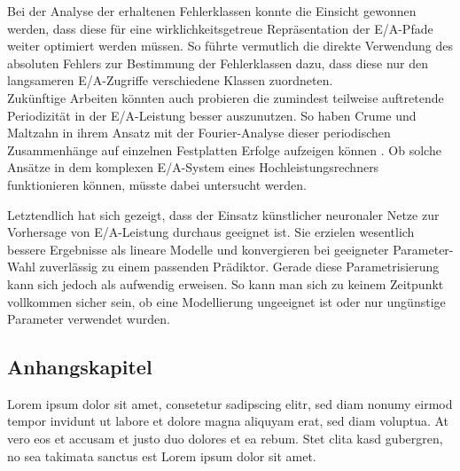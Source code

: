 \documentclass[
	12pt,
	a4paper,
	BCOR10mm,
	DIV14,
	listof=totoc,
	bibliography=totoc,
	headsepline
]{scrreprt}
\begin{document}
Bei der Analyse der erhaltenen Fehlerklassen konnte die Einsicht gewonnen werden, dass diese für eine wirklichkeitsgetreue Repräsentation der E/A-Pfade weiter optimiert werden müssen. 
So führte vermutlich die direkte Verwendung des absoluten Fehlers zur Bestimmung der Fehlerklassen dazu, dass diese nur den langsameren E/A-Zugriffe verschiedene Klassen zuordneten.\\
Zukünftige Arbeiten könnten auch probieren die zumindest teilweise auftretende Periodizität in der E/A-Leistung besser auszunutzen. 
So haben Crume und Maltzahn in ihrem Ansatz mit der Fourier-Analyse dieser periodischen Zusammenhänge auf einzelnen Festplatten Erfolge aufzeigen können \cite{Crume:2013:FML:2538542.2538561}.
Ob solche Ansätze in dem komplexen E/A-System eines Hochleistungsrechners funktionieren können, müsste dabei untersucht werden.\medskip

Letztendlich hat sich gezeigt, dass der Einsatz künstlicher neuronaler Netze zur Vorhersage von E/A-Leistung durchaus geeignet ist.
Sie erzielen wesentlich bessere Ergebnisse als lineare Modelle und konvergieren bei geeigneter Parameter-Wahl zuverlässig zu einem passenden Prädiktor.
Gerade diese Parametrisierung kann sich jedoch als aufwendig erweisen.
So kann man sich zu keinem Zeitpunkt vollkommen sicher sein, ob eine Modellierung ungeeignet ist oder nur ungünstige Parameter verwendet wurden.




\listoffigures

\listoftables

\lstlistoflistings

\begin{appendices}

\chapter{Anhangskapitel}

Lorem ipsum dolor sit amet, consetetur sadipscing elitr, sed diam nonumy eirmod tempor invidunt ut labore et dolore magna aliquyam erat, sed diam voluptua.
At vero eos et accusam et justo duo dolores et ea rebum.
Stet clita kasd gubergren, no sea takimata sanctus est Lorem ipsum dolor sit amet.

\end{appendices}

\newpage

\thispagestyle{empty}

\chapter*{}
\end{document}
